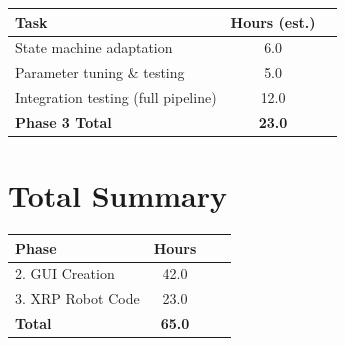\documentclass[a4]{article}
\begin{document}
\begin{center}
\begin{tabular}{lcc}
\toprule
\textbf{Task} & \textbf{Hours (est.)} \\
\midrule
State machine adaptation & 6.0  \\
Parameter tuning \& testing & 5.0  \\
Integration testing (full pipeline) & 12.0  \\
\midrule
\textbf{Phase 3 Total} & \textbf{23.0} \\
\bottomrule
\end{tabular}
\end{center}

\section*{Total Summary}

\begin{center}
\begin{tabular}{lccc}
\toprule
\textbf{Phase} & \textbf{Hours} \\
\midrule
2. GUI Creation & 42.0   \\
3. XRP Robot Code & 23.0   \\
\midrule
\textbf{Total} & \textbf{65.0}  \\
\bottomrule
\end{tabular}
\end{center}
\end{document}
